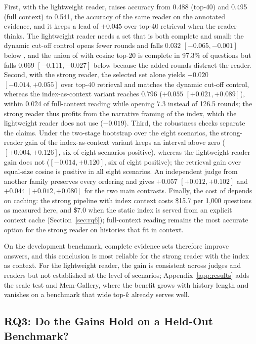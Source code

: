 First, with the lightweight reader, \qss{} raises accuracy from 0.488 (top-40) and 0.495 (full context) to 0.541, the accuracy of the same reader on the annotated evidence, and it keeps a lead of $+0.045$ over top-40 retrieval when the reader thinks. The lightweight reader needs a set that is both complete and small: the dynamic cut-off control opens fewer rounds and falls 0.032 $[-0.065, -0.001]$ below \qss{}, and the union of \qss{} with cosine top-20 is complete in 97.3\% of questions but falls 0.069 $[-0.111, -0.027]$ below \qss{} because the added rounds distract the reader. Second, with the strong reader, the selected set alone yields $+0.020$ $[-0.014, +0.055]$ over top-40 retrieval and matches the dynamic cut-off control, whereas the index-as-context variant reaches 0.796 ($+0.055$ $[+0.021, +0.089]$), within 0.024 of full-context reading while opening 7.3 instead of 126.5 rounds; the strong reader thus profits from the narrative framing of the index, which the lightweight reader does not use ($-0.019$). Third, the robustness checks separate the claims. Under the two-stage bootstrap over the eight scenarios, the strong-reader gain of the index-as-context variant keeps an interval above zero ($[+0.004, +0.126]$, six of eight scenarios positive), whereas the lightweight-reader gain does not ($[-0.014, +0.120]$, six of eight positive); the retrieval gain over equal-size cosine is positive in all eight scenarios. An independent judge from another family preserves every ordering and gives $+0.057$ $[+0.012, +0.102]$ and $+0.044$ $[+0.012, +0.080]$ for the two main contrasts. Finally, the cost of \qss{} depends on caching: the strong pipeline with index context costs \$15.7 per 1,000 questions as measured here, and \$7.0 when the static index is served from an explicit context cache (Section~\ref{sec:rq6}); full-context reading remains the most accurate option for the strong reader on histories that fit in context.

On the development benchmark, complete evidence sets therefore improve answers, and this conclusion is most reliable for the strong reader with the index as context. For the lightweight reader, the gain is consistent across judges and readers but not established at the level of scenarios; Appendix~\ref{app:results} adds the scale test and Mem-Gallery, where the benefit grows with history length and vanishes on a benchmark that wide top-$k$ already serves well.

\subsection{RQ3: Do the Gains Hold on a Held-Out Benchmark?}
\label{sec:rq3}

